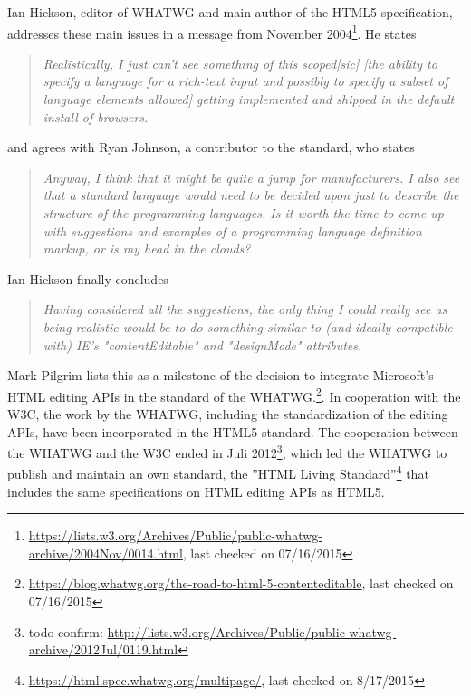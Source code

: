
Ian Hickson, editor of WHATWG and main author of the HTML5 specification, addresses these main issues in a message from November 2004\footnote{\url{https://lists.w3.org/Archives/Public/public-whatwg-archive/2004Nov/0014.html}, last checked on 07/16/2015}. He states

\begin{quotation}
\textit{Realistically, I just can't see something of this scoped[sic] [the ability to specify a language for a rich-text input and possibly to specify a subset of language elements allowed] getting implemented and shipped in the default install of browsers.}
\end{quotation}

and agrees with Ryan Johnson, a contributor to the standard, who states

\begin{quotation}
\textit{Anyway, I think that it might be quite a jump for manufacturers. I also see that a standard language would need to be decided upon just to describe the structure of the programming languages. Is it worth the time to come up with suggestions and examples of a programming language definition markup, or is my head in the clouds?}
\end{quotation}

Ian Hickson finally concludes

\begin{quotation}
\textit{Having considered all the suggestions, the only thing I could really see 
as being realistic would be to do something similar to (and ideally 
compatible with) IE's "contentEditable" and "designMode" attributes.}
\end{quotation}

Mark Pilgrim lists this as a milestone of the decision to integrate Microsoft's HTML editing APIs in the standard of the WHATWG.\footnote{\url{https://blog.whatwg.org/the-road-to-html-5-contenteditable}, last checked on 07/16/2015}. In cooperation with the W3C, the work by the WHATWG, including the standardization of the editing APIs, have been incorporated in the HTML5 standard. The cooperation between the WHATWG and the W3C ended in Juli 2012\footnote{todo confirm: \url{http://lists.w3.org/Archives/Public/public-whatwg-archive/2012Jul/0119.html}}, which led the WHATWG to publish and maintain an own standard, the ''HTML Living Standard''\footnote{\url{https://html.spec.whatwg.org/multipage/}, last checked on 8/17/2015} that includes the same specifications on HTML editing APIs as HTML5.




